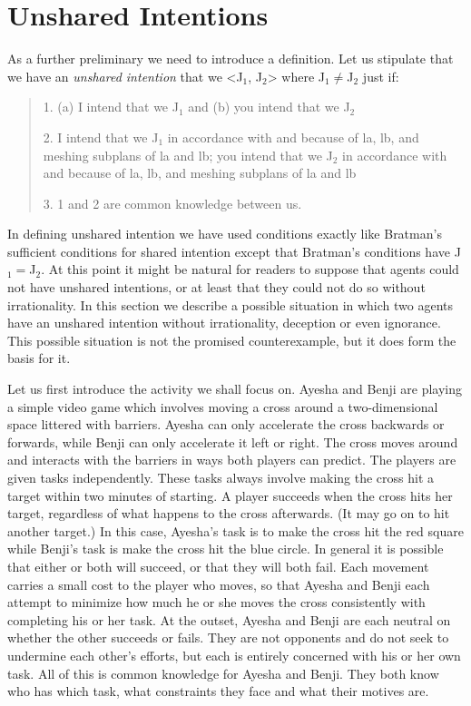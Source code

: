 \documentclass[12pt,\papersize]{extarticle}
\begin{document}
\section{Unshared Intentions}
As a further preliminary we need to introduce a definition.
Let us stipulate that we have an \emph{unshared intention} that we <J$_1$, J$_2$> where J$_1$$\neq$J$_2$ just if:
%
\begin{quote}
\label{df:unshared_intention}
1. (a) I intend that we J$_1$ and (b) you intend that we J$_2$
 
2. I intend that we J$_1$ in accordance with and because of la, lb, and meshing subplans of la and lb; you intend that we J$_2$ in accordance with and because of la, lb, and meshing subplans of la and lb
 
3. 1 and 2 are common knowledge between us.
\end{quote}
In defining unshared intention we have used conditions exactly like Bratman's sufficient conditions for shared intention except that Bratman's conditions have J$_1$$=$J$_2$.
At this point it might be natural for readers to suppose that agents could not have unshared intentions,
or at least that they could not do so without irrationality.
In this section we describe a possible situation in which two agents  have an unshared intention without irrationality, deception or even ignorance.
This possible situation is not the promised counterexample, but it does form the basis for it.

Let us first introduce the activity we shall focus on.
Ayesha and Benji  are playing a simple video game which involves moving a cross around a two-dimensional space littered with barriers.
Ayesha can only accelerate the cross backwards or forwards,
while Benji can only accelerate it left or right. 
The cross moves around and interacts with the barriers in ways both players can predict.
The players are given tasks independently. 
These tasks always involve making the cross hit a target within two minutes of starting. 
A player succeeds when the cross hits her target, regardless of what happens to the cross afterwards.  
(It may go on to hit another target.)
In this case, 
	Ayesha's task is to make the cross hit the red square
	while
	Benji's task is make the cross hit the blue circle. 
In general it is possible that either or both will succeed, or that they will both fail.
Each movement carries a small cost to the player who moves, so that Ayesha and Benji each attempt to minimize how much he or she moves the cross consistently with completing his or her task.
At the outset, 
Ayesha and Benji are each neutral on whether the other succeeds or fails.
They are not opponents and do not seek to undermine each other's efforts, but each is entirely concerned  with his or her own task.
All of this is common knowledge for Ayesha and Benji.
They both know who has which task, what constraints they face and what their motives are.
\end{document}
